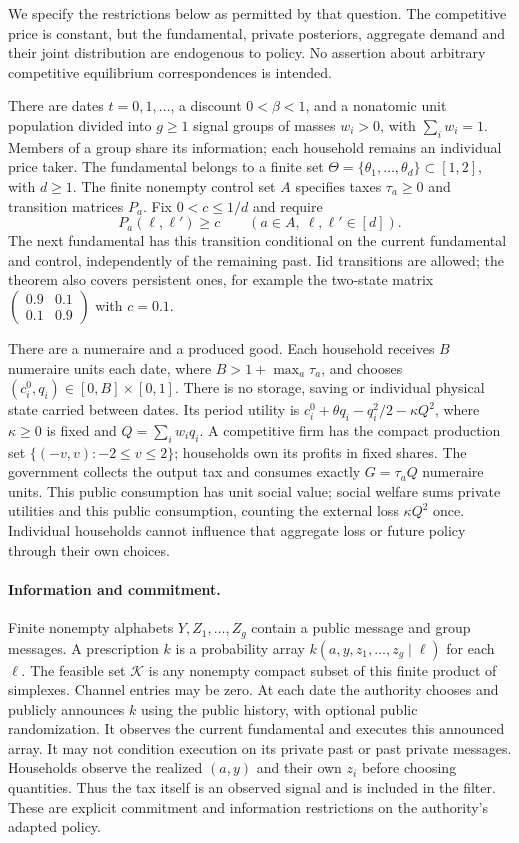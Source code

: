 \documentclass[11pt,a4paper]{article}
\newcommand{\cK}{\mathcal K}
\begin{document}
We specify the restrictions below as permitted by that question. The competitive
price is constant, but the fundamental, private posteriors, aggregate demand and
their joint distribution are endogenous to policy. No assertion about arbitrary
competitive equilibrium correspondences is intended.

There are dates $t=0,1,\ldots$, a discount $0<\beta<1$, and a nonatomic unit
population divided into $g\geq1$ signal groups of masses $w_i>0$, with
$\sum_iw_i=1$. Members of a group share its information; each household remains
an individual price taker. The fundamental belongs to a finite set
$\Theta=\{\theta_1,\ldots,\theta_d\}\subset[1,2]$, with $d\geq1$.
The finite nonempty control set $A$ specifies taxes $\tau_a\geq0$ and transition
matrices $P_a$. Fix $0<c\leq1/d$ and require
\[
 P_a(\ell,\ell')\geq c\qquad(a\in A,\ \ell,\ell'\in[d]).
\]
The next fundamental has this transition conditional on the current fundamental
and control, independently of the remaining past. Iid transitions are allowed;
the theorem also covers persistent ones, for example the two-state matrix
$\left(\begin{smallmatrix}0.9&0.1\\0.1&0.9\end{smallmatrix}\right)$ with $c=0.1$.

There are a numeraire and a produced good. Each household receives $B$ numeraire
units each date, where $B>1+\max_a\tau_a$, and chooses
$(c_i^0,q_i)\in[0,B]\times[0,1]$. There is no storage, saving or individual
physical state carried between dates. Its period utility is
$c_i^0+\theta q_i-q_i^2/2-\kappa Q^2$, where $\kappa\geq0$ is fixed and
$Q=\sum_iw_iq_i$. A competitive firm has the compact production set
$\{(-v,v):-2\leq v\leq2\}$; households own its profits in fixed shares.
The government collects the output tax and consumes exactly
$G=\tau_aQ$ numeraire units. This public consumption has unit social value;
social welfare sums private utilities and this public consumption, counting
the external loss $\kappa Q^2$ once. Individual households cannot influence that
aggregate loss or future policy through their own choices.

\paragraph{Information and commitment.}
Finite nonempty alphabets $Y,Z_1,\ldots,Z_g$ contain a public message and group
messages. A prescription $k$ is a probability array
$k(a,y,z_1,\ldots,z_g\mid\ell)$ for each $\ell$.
The feasible set $\cK$ is any nonempty compact subset of this finite product of
simplexes. Channel entries may be zero. At each date the authority chooses and
publicly announces $k$ using the public history, with optional public
randomization. It observes the current fundamental and executes this announced
array. It may not condition execution on its private past or past private
messages. Households observe the realized $(a,y)$ and their own $z_i$ before
choosing quantities. Thus the tax itself is an observed signal and is included
in the filter. These are explicit commitment and information restrictions on
the authority's adapted policy.
\end{document}
